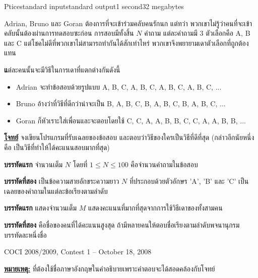 \documentclass[11pt,a4paper]{article}
\begin{document}
\begin{problem}{Ptice}{standard input}{standard output}{1 second}{32 megabytes}

Adrian, Bruno และ Goran ต้องการที่จะเข้าร่วมคลับคนรักนก แต่ทว่า พวกเขาไม่รู้ว่าคนที่จะเข้าคลับนั้นต้องผ่านการทดสอบซะก่อน
การสอบมีทั้งสิ้น $N$ คำถาม แต่ละคำถามมี $3$ ตัวเลือกคือ A, B และ C
แต่โชคไม่ดีที่พวกเขาไม่สามารถทำกันได้สักเท่าไหร่ พวกเขาจึงพยายามเดาตัวเลือกที่ถูกต้องแทน

\textbf แต่ละคนนั้นจะมีวิธีในการเดาที่แตกต่างกันดังนี้
\begin{itemize}
  \item Adrian จะทำข้อสอบด้วยรูปแบบ A, B, C, A, B, C, A, B, C, A, B, C, ...
  \item Bruno อ้างว่าที่วิธีที่ดีกว่าน่าจะเป็น B, A, B, C, B, A, B, C, B, A, B, C, ...
  \item Goran ก็หัวเราะใส่เพื่อนและจะตอบโดยใช้ C, C, A, A, B, B, C, C, A, A, B, B, ...
\end{itemize}

\underline{\textbf{โจทย์}} จงเขียนโปรแกรมที่รับเฉลยของข้อสอบ และตอบว่าวิธีของใครเป็นวิธีที่ดีที่สุด (กล่าวอีกนัยหนึ่งคือ เป็นวิธีที่ทำให้ได้คะแนนสอบมากที่สุด)

\InputFile

\textbf{บรรทัดแรก} จำนวนเต็ม $N$ โดยที่ $1 \leq N \leq 100$ คือจำนวนคำถามในข้อสอบ

\textbf{บรรทัดที่สอง} เป็นข้อความสายอักขระความยาว $N$ ที่ประกอบด้วยตัวอักษร 'A', 'B' และ 'C' เป็นเฉลยของคำถามในแต่ละข้อเรียงตามลำดับ

\OutputFile

\textbf{บรรทัดแรก} แสดงจำนวนเต็ม $M$ แสดงคะแนนที่มากที่สุดจากการใช้วิธีเดาของทั้งสามคน

\textbf{บรรทัดที่สอง} คือชื่อของคนที่ได้คะแนนสูงสุด ถ้ามีหลายคนให้ตอบชื่อเรียงตามลำดับพจนานุกรม บรรทัดละหนึ่งชื่อ

\Source

COCI 2008/2009, Contest 1 – October 18, 2008

\underline{\textbf{หมายเหตุ:}} ที่ต้องใช้ชื่อภาษาอังกฤษในคำอธิบายเพราะคำตอบจะได้สอดคล้องกับโจทย์

\Examples

\begin{example}
%
%
\end{example}

\end{problem}
\end{document}
